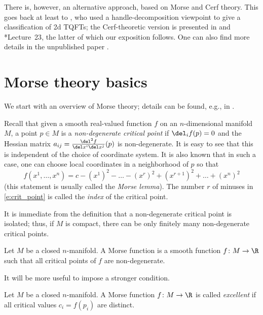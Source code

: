 There is, however, an alternative approach, based on Morse and Cerf theory.
This goes back at least to , who used a handle-decomposition
viewpoint to give a classification of 2d TQFTs; the Cerf-theoretic version
is presented in  and *{Lecture~23},
the latter of which our exposition follows. One can also find more details
in the unpublished paper .

\section{Morse theory basics}\label{s:morse}

We start with an overview of Morse theory; details can be found, e.g., in
.

Recall that given a smooth real-valued function $f$ on an $n$-dimensional
manifold $M$, a point $p\in M$ is a \emph{non-degenerate critical point}
 if
$\del_i f (p)=0$ and the Hessian matrix
$a_{ij}=\frac{\del^2 f}{\del  x^i \del x^j}(p)$ is non-degenerate. It is easy to
see that this is independent of the choice of coordinate system. It is also
known that in such a case, one can choose local coordinates in a neighborhood
of $p$ so that
\begin{equation}\label{e:crit_point}
  f(x^1, \dots, x^n)=c-(x^1)^2 -\dots -(x^r)^2
  + (x^{r+1})^2+ \dots + (x^n)^2
\end{equation}
(this statement is usually called the \emph{Morse lemma}).
The number $r$ of minuses in \eqref{e:crit_point} is called the \emph{index}
of the critical point.

It is immediate from the definition that a non-degenerate critical point
is isolated; thus, if $M$ is compact, there can be only finitely many
non-degenerate critical points.

\begin{definition}\label{d:morse_function}
  Let $M$ be a closed $n$-manifold. A Morse function is a
  smooth function $f\colon M\to \R$ such that all critical points
  of $f$ are non-degenerate.
\end{definition}

It will be more useful to impose a stronger condition.

\begin{definition}\label{d:morse_function2}
  Let $M$ be a closed $n$-manifold. A Morse function  $f\colon M\to \R$
  is called \emph{excellent} if all critical
  values $c_i=f(p_i)$ are distinct.
\end{definition}

